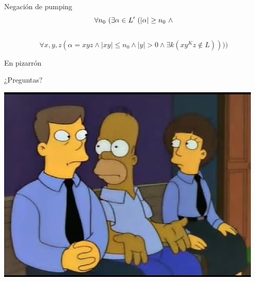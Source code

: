 \documentclass{beamer}
\begin{document}
\begin{frame}{Negación de pumping}
  $$\forall n_0 \textnormal{ } (\exists \alpha \in L'\textnormal{ } (|\alpha| \geq n_0 \textnormal{ } \land  $$ \\
  $$\forall x, y, z (\alpha = xyz \land |xy| \leq n_0 \land  |y| > 0 \land \exists k (xy^Kz \notin L)))) $$
  \vspace{2em}
  \begin{center}
    En pizarrón
  \end{center}
\end{frame}

\begin{frame}{¿Preguntas?}
	\begin{center}
		\includegraphics[scale=0.4]{homero-pelicula.jpg}
	\end{center}
\end{frame}
\end{document}
